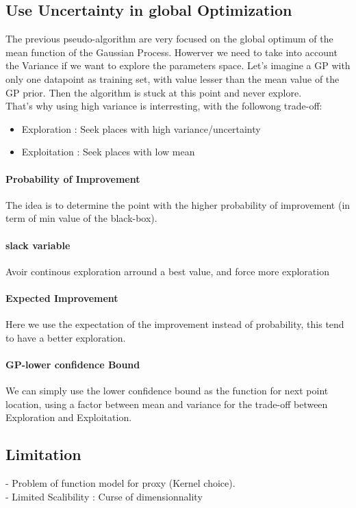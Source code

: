 
		\subsection{Use Uncertainty in global Optimization}

			The previous pseudo-algorithm are very focused on the global optimum of the mean function of the Gaussian Process. Howerver we need to take into account the Variance if we want to explore the parameters space. Let's imagine a GP with only one datapoint as training set, with value lesser than the mean value of the GP prior. Then the algorithm is stuck at this point and never explore.\\
			That's why using high variance is interresting, with the followong trade-off:
			\begin{itemize}
				\item Exploration : Seek places with high variance/uncertainty
				\item Exploitation : Seek places with low mean
			\end{itemize}


			\paragraph*{Probability of Improvement}

				The idea is to determine the point with the higher probability of improvement (in term of min value of the black-box).

			\paragraph*{slack variable}
				Avoir continous exploration arround a best value, and force more exploration

			\paragraph*{Expected Improvement}
				Here we use the expectation of the improvement instead of probability, this tend to have a better exploration.

			\paragraph*{GP-lower confidence Bound}

				We can simply use the lower confidence bound as the function for next point location, using a factor between mean and variance for the trade-off between Exploration and Exploitation.

		\subsection{Limitation}
			- Problem of function model for proxy (Kernel choice).\\
			- Limited Scalibility : Curse of dimensionnality
